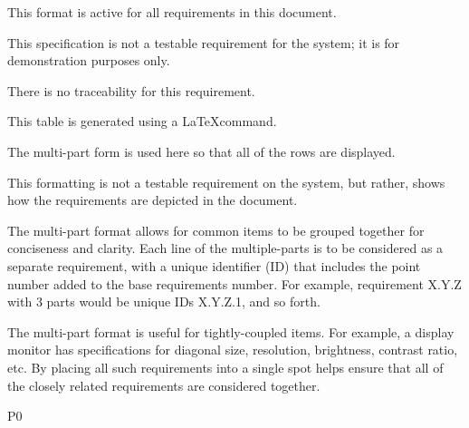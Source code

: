 {
	\item [All] This format is active for all requirements in this document.
}
{This specification is not a testable requirement for the system; it is for demonstration purposes only.}
{
\item [N/A] There is no traceability for this requirement.
}
{\small
	\item This table is generated using a \LaTeX command.
  \item The multi-part form is used here so that all of the rows are displayed.
  \item This formatting is not a testable requirement on the system, but rather, shows how the requirements are depicted in the document.
	\item The multi-part format allows for common items to be grouped together for conciseness and clarity. Each line of the multiple-parts is to be considered as a separate requirement, with a unique identifier (ID) that includes the point number added to the base requirements number. For example, requirement X.Y.Z with 3 parts would be unique IDs X.Y.Z.1, and so forth.
	\item The multi-part format is useful for tightly-coupled items. For example, a display monitor has specifications for diagonal size, resolution, brightness, contrast ratio, etc. By placing all such requirements into a single spot helps ensure that all of the closely related requirements are considered together.
}
{P0}



